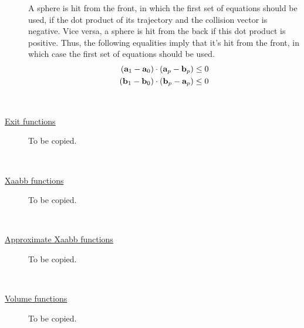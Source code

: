 \documentclass[11pt]{article}
\begin{document}
\begin{description}
A sphere is hit from the front, in which the first set of equations should be used, if the dot product of its trajectory and the collision vector is negative. Vice versa, a sphere is hit from the back if this dot product is positive. Thus, the following equalities imply that it's hit from the front, in which case the first set of equations should be used.
\begin{align*}
(\vb{a}_1-\vb{a}_0) \cdot (\vb{a}_p-\vb{b}_p) &\le 0 \\
(\vb{b}_1-\vb{b}_0) \cdot (\vb{b}_p-\vb{a}_p) &\le 0
\end{align*}


\hfill \\
\item[\underline{Exit functions}]

To be copied.

\hfill \\
\item[\underline{Xaabb functions}]

To be copied.

\hfill \\
\item[\underline{Approximate Xaabb functions}]

To be copied.

\hfill \\
\item[\underline{Volume functions}]

To be copied.












\end{description}



\end{document}
